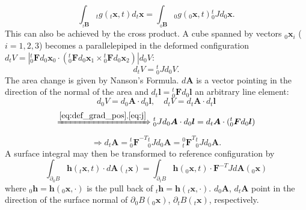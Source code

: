 \documentclass[m,times]{cgMA}
\begin{document}
\begin{equation} \label{eq:volume_integral}
  \int _ { {_t\boldsymbol { B } }}  {_tg} ( {_t\boldsymbol { x }} ,t)  d {_t\boldsymbol { x }} = \int _ { { _0\boldsymbol { B }}} {_0 g } ( {_0\boldsymbol{x}},t) {^t_0 J}d {_0\boldsymbol{x}}.
\end{equation}
This can also be achieved by the cross product. A cube spanned by vectors $_0\boldsymbol{x}_i$ ($i=1,2,3$) becomes a parallelepiped in the deformed configuration $d_tV =|{^t_0\boldsymbol{F}}d_0\boldsymbol{x}_0 \cdot({^t_0\boldsymbol{F}}d_0\boldsymbol{x}_1 \times {^t_0\boldsymbol{F}}d_0\boldsymbol{x}_2)| {d_0V}$:
\begin{equation}\label{eq:j}
  d_tV = {^t_0J} d_0V.
\end{equation}
The area change is given by Nanson's Formula. $d\boldsymbol{A}$ is a vector pointing in the direction of the normal of the area and $d_t\boldsymbol{l} ={}^t_0\boldsymbol{F}d_0\boldsymbol{l}$ an arbitrary line element:
$$ d{_0V} = d{_0\boldsymbol{A}}\cdot d{_0\boldsymbol{l}},\quad d{_tV} = d{_t\boldsymbol{A}} \cdot d{_t\boldsymbol{l}}$$
$$ \xRightarrow{\ref{eq:def_grad_pos},\ref{eq:j}} {^t_0J} d_0\boldsymbol{A} \cdot d_0\boldsymbol{l} = d{_t\boldsymbol{A}} \cdot ({^t_0\boldsymbol{F}}d{_0\boldsymbol{l}})$$
\begin{equation}
  \Rightarrow d_t\boldsymbol{A} = {^t_0\boldsymbol{F}}^{-T} {^t_0}J d_0\boldsymbol{A} = {^0_t\boldsymbol{F}}^{T} {^t_0}J d_0\boldsymbol{A}.
\end{equation}
A surface integral may then be transformed to reference configuration by
\begin{equation}\label{eq:surface_integral}
  \int _ { \partial {_0B}  } \boldsymbol{h} ( {_t\boldsymbol{x}} , t ) \cdot d \boldsymbol{A} ( {_t\boldsymbol{x}} ) =  \int _ { \partial {_tB} } \boldsymbol{h} ( {_0\boldsymbol{x}} , t ) \cdot \boldsymbol{F}^{-T}J d \boldsymbol{A} ( {_0\boldsymbol{x}} )
\end{equation}
where $_0\boldsymbol{h} = \boldsymbol{h}(_0\boldsymbol{x},\cdot)$ is the pull back of $_t\boldsymbol{h} = \boldsymbol{h}(_t\boldsymbol{x},\cdot)$. $d_0\boldsymbol{A}$, $d_t\boldsymbol{A}$ point in the direction of the surface normal of $\partial {_0B}(_0\boldsymbol{x})$, $\partial {_tB}(_t\boldsymbol{x})$, respectively.
\cite{MIT:CONTINUUM_MECHANICS}
\cite{MPM:COURSE}
\end{document}
